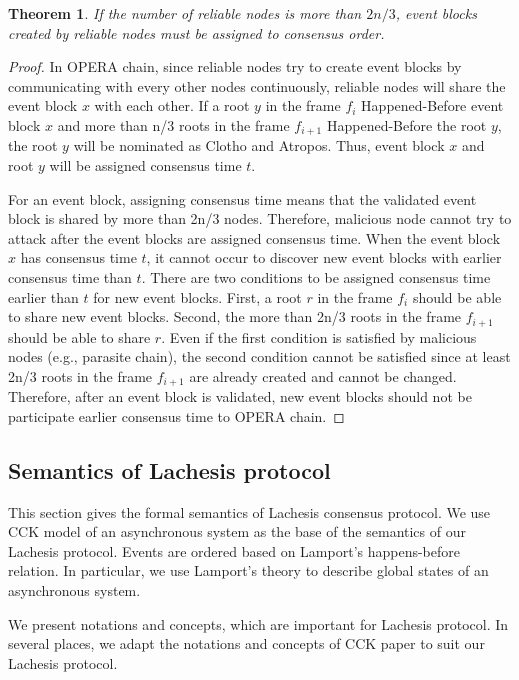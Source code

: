 \documentclass{article}
\newtheorem{thm}{Theorem}[section]
\begin{document}
\begin{thm}
\label{thm:bft}
If the number of reliable nodes is more than $2n/3$, event blocks created by reliable nodes must be assigned to consensus order.
\end{thm}

\begin{proof}
In OPERA chain, since reliable nodes try to create event blocks by communicating with every other nodes continuously, reliable nodes will share the event block $x$ with each other. If a root $y$ in the frame $f_{i}$ Happened-Before event block $x$ and more than n/3 roots in the frame $f_{i+1}$ Happened-Before the root $y$, the root $y$ will be nominated as Clotho and Atropos. Thus, event block $x$ and root $y$ will be assigned consensus time $t$. 

For an event block, assigning consensus time means that the validated event block is shared by more than 2n/3 nodes. Therefore, malicious node cannot try to attack after the event blocks are assigned consensus time. When the event block $x$ has consensus time $t$, it cannot occur to discover new event blocks with earlier consensus time than $t$.
There are two conditions to be assigned consensus time earlier than $t$ for new event blocks. First, a root $r$ in the frame $f_{i}$ should be able to share new event blocks. Second, the more than 2n/3 roots in the frame $f_{i+1}$ should be able to share $r$. Even if the first condition is satisfied by malicious nodes (e.g., parasite chain),
the second condition cannot be satisfied since at least 2n/3 roots in the frame $f_{i+1}$ are already created and cannot be changed. Therefore, after an event block is validated, new event blocks should not be participate earlier consensus time to OPERA chain. 
\end{proof}



\subsection{Semantics of Lachesis protocol}\label{sec:semantics} 

This section gives the formal semantics of Lachesis consensus protocol.
We use CCK model \cite{cck92} of an asynchronous system as the base of the semantics of our Lachesis protocol. Events are ordered based on Lamport's happens-before relation. 
In particular, we use Lamport’s theory to describe global states of an asynchronous system.

We present notations and concepts, which are important for Lachesis protocol. In several places, we adapt the notations and concepts of CCK paper to suit our Lachesis protocol. 
\end{document}
